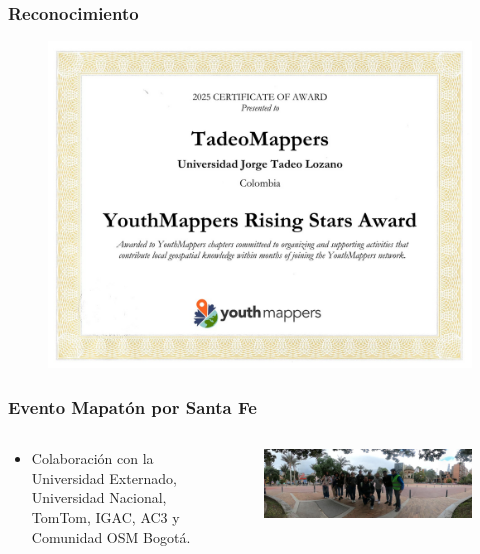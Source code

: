\documentclass[17pt, t, lualatex]{beamer}
\begin{document}
\begin{frame}
  \frametitle{Reconocimiento}
  \begin{figure}
    \centering
    \includegraphics[height=0.9\textheight]{img/YM.jpg}
  \end{figure}
\end{frame}

\begin{frame}
  \frametitle{Evento Mapatón por Santa Fe}
  \begin{columns}
    \begin{column}{.3\textwidth}
      \begin{itemize}
        \item Colaboración con la Universidad Externado, Universidad Nacional, TomTom, IGAC, AC3 y Comunidad OSM Bogotá.
      \end{itemize}
    \end{column}

    \begin{column}{.7\textwidth}
      \begin{figure}
        \centering
        \includegraphics[width=\textwidth]{img/SantaFe.jpg}
      \end{figure}
    \end{column}
  \end{columns}
\end{frame}
\end{document}
